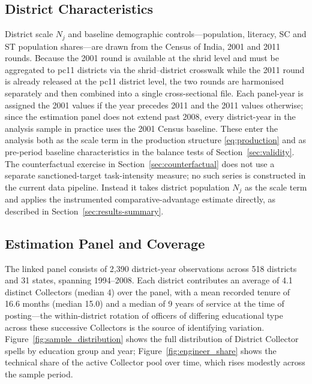 \subsection{District Characteristics}
\label{sec:data-districts}

District scale $N_j$ and baseline demographic controls---population, literacy, SC
and ST population shares---are drawn from the Census of India, 2001 and 2011 rounds.
Because the 2001 round is available at the shrid level and must be aggregated to
pc11 districts via the shrid--district crosswalk while the 2011 round is already
released at the pc11 district level, the two rounds are harmonised separately and
then combined into a single cross-sectional file. Each panel-year is assigned the
2001 values if the year precedes 2011 and the 2011 values otherwise; since the
estimation panel does not extend past 2008, every district-year in the analysis
sample in practice uses the 2001 Census baseline. These enter the analysis both as
the scale term in the production structure \eqref{eq:production} and as pre-period
baseline characteristics in the balance tests of Section~\ref{sec:validity}. The
counterfactual exercise in Section~\ref{sec:counterfactual} does not use a separate
sanctioned-target task-intensity measure; no such series is constructed in the
current data pipeline. Instead it takes district population $N_j$ as the scale term
and applies the instrumented comparative-advantage estimate directly, as described
in Section~\ref{sec:results-summary}.

\subsection{Estimation Panel and Coverage}
\label{sec:data-coverage}

The linked panel consists of 2,390 district-year observations across 518 districts
and 31 states, spanning 1994--2008. Each district contributes an average of 4.1
distinct Collectors (median 4) over the panel, with a mean recorded tenure of 16.6
months (median 15.0) and a median of 9 years of service at the time of posting---the
within-district rotation of officers of differing educational type across these
successive Collectors is the source of identifying variation. Figure~\ref{fig:sample_distribution}
shows the full distribution of District Collector spells by education group and
year; Figure~\ref{fig:engineer_share} shows the technical share of the active
Collector pool over time, which rises modestly across the sample period.

